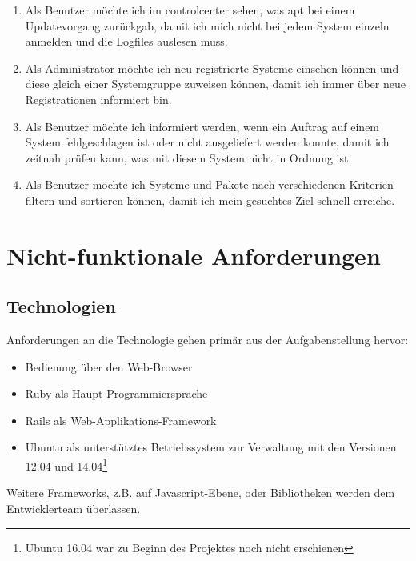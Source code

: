 \begin{enumerate}
    \item Als Benutzer möchte ich im \gls{controlcenter} sehen, was \gls{apt} bei einem Updatevorgang zurückgab, damit ich mich nicht bei jedem System einzeln anmelden und die Logfiles auslesen muss.
    \item Als Administrator möchte ich neu registrierte Systeme einsehen können und diese gleich einer Systemgruppe zuweisen können, damit ich immer über neue Registrationen informiert bin.
    \item Als Benutzer möchte ich informiert werden, wenn ein Auftrag auf einem System fehlgeschlagen ist oder nicht ausgeliefert werden konnte, damit ich zeitnah prüfen kann, was mit diesem System nicht in Ordnung ist.
    \item Als Benutzer möchte ich Systeme und Pakete nach verschiedenen Kriterien filtern und sortieren können, damit ich mein gesuchtes Ziel schnell erreiche.
\end{enumerate}

\clearpage
\section{Nicht-funktionale Anforderungen}
\begin{comment}
Alle NFA/Qualitätsattribute abgedeckt und testbar beschrieben
\end{comment}

\subsection*{Technologien}

Anforderungen an die Technologie gehen primär aus der Aufgabenstellung hervor:

\begin{itemize}
    \item Bedienung über den Web-Browser
    \item Ruby als Haupt-Programmiersprache
    \item Rails als Web-Applikations-Framework
    \item Ubuntu als unterstütztes Betriebssystem zur Verwaltung mit den Versionen 12.04 und 14.04\footnote{Ubuntu 16.04 war zu Beginn des Projektes noch nicht erschienen}
\end{itemize}

Weitere Frameworks, z.B. auf Javascript-Ebene, oder Bibliotheken werden dem Entwicklerteam überlassen.

